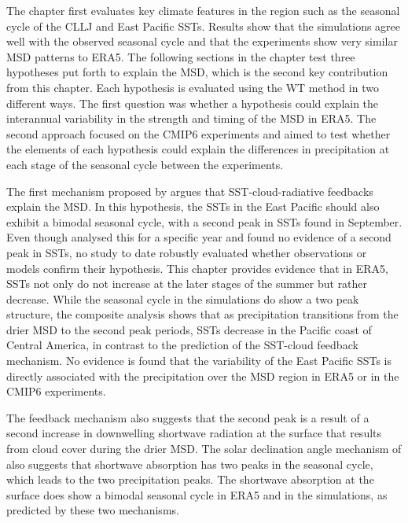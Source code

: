 The chapter first evaluates key climate features in the region such as the seasonal cycle of the CLLJ and East Pacific SSTs. Results show that the simulations agree well with the observed seasonal cycle and that the experiments show very similar MSD patterns to ERA5. 
The following sections in the chapter test three hypotheses put forth to explain the MSD, which is the second key contribution from this chapter.
 Each hypothesis is evaluated using the WT method in two different ways. The first question was whether a hypothesis could explain  the interannual variability in the strength and timing of the MSD  in ERA5. The second approach focused on the CMIP6 experiments and aimed to test whether the elements of each hypothesis could explain the differences in precipitation at each stage of the seasonal cycle between the experiments.
 
 The first mechanism proposed by \cite{magana1999} argues that SST-cloud-radiative feedbacks explain the MSD. In this hypothesis, the SSTs in the East Pacific should also exhibit a bimodal seasonal cycle, with a second peak in SSTs found in September. Even though \cite{magana2005} analysed this for a specific year and found no evidence of a second peak in SSTs, no study to date robustly evaluated whether observations or models confirm their hypothesis. This chapter provides evidence that in ERA5, SSTs not only do not increase at the later stages of the summer but rather decrease. While the seasonal cycle in the simulations do show a two peak structure, the composite analysis shows that as precipitation transitions from the drier MSD to the second peak periods, SSTs decrease in the Pacific coast of Central America, in contrast to the prediction of the SST-cloud feedback mechanism. No evidence is found that the variability of the East Pacific SSTs is directly associated with the precipitation over the MSD region in ERA5 or in the CMIP6 experiments. 

 
The feedback mechanism also suggests that the second peak is a result of a second increase in downwelling shortwave radiation at the surface that results from cloud cover during the drier MSD.
The solar declination angle mechanism of \cite{karnauskas2013} also suggests that shortwave absorption has two peaks in the seasonal cycle, which leads to the two precipitation peaks. The shortwave absorption at the surface does show a bimodal seasonal cycle in ERA5 and in the simulations, as predicted by these two mechanisms.

